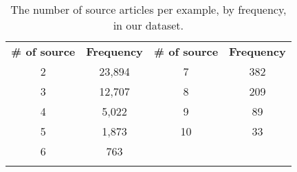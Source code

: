 \documentclass[11pt,a4paper]{article}
\begin{document}
\begin{table}[t!]
\small
\centering
\begin{tabular}{c c | cc} \Xhline{2\arrayrulewidth}
             \textbf{\# of source} & \textbf{Frequency}& \textbf{\# of source} & \textbf{Frequency} \\ \Xhline{\arrayrulewidth} 
             
             2	&	23,894	&	7	&	382	\\
            3	&	12,707	&	8	&	209	\\
            4	&	5,022	&	9	&	89	\\
            5	&	1,873	&	10	&	33	\\
            6	&	763	&		&		\\
              
             \Xhline{2\arrayrulewidth}
            
\end{tabular}
\caption{The number of source articles per example, by frequency, in our dataset.}
\label{tab:num_sources}
\end{table}
\end{document}
